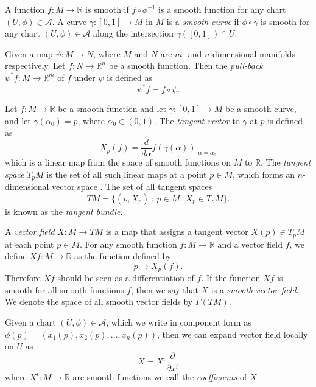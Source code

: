 A function $f : M \to \mathbb{R}$ is smooth if $f \circ \phi^{-1}$ is a smooth function for any chart $(U, \phi) \in \mathcal{A}$. A curve $\gamma : [0, 1] \to M$ in $M$ is a \textit{smooth curve} if $\phi \circ \gamma$ is smooth for any chart $(U, \phi) \in \mathcal{A}$ along the intersection $\gamma([0,1]) \cap U$.

Given a map $\psi : M \to N$, where $M$ and $N$ are $m$- and $n$-dimensional manifolds respectively. Let $f : N \to \mathbb{R}^n$ be a smooth function. Then the \textit{pull-back} $\psi^* f : M \to \mathbb{R}^m$ of $f$ under $\psi$ is defined as
\begin{equation}
	\psi^* f = f \circ \psi.
\end{equation}

Let $f : M \to \mathbb{R}$ be a smooth function and let $\gamma : [0, 1] \to M$ be a smooth curve, and let $\gamma(\alpha_0) = p$, where $\alpha_0 \in (0,1)$. The \textit{tangent vector} to $\gamma$ at $p$ is defined as
\begin{equation}
	X_p(f) = \frac{d}{d \alpha} f(\gamma(\alpha)) \bigg|_{\alpha = \alpha_0}
\end{equation}
which is a linear map from the space of smooth functions on $M$ to $\mathbb{R}$. The \textit{tangent space} $T_p M$ is the set of all such linear maps at a point $p \in M$, which forms an $n$-dimensional vector space \citep{misnerGravitation2017}. The set of all tangent spaces
\begin{equation}
	TM = \{ (p, X_p)\ :\ p \in M,\ X_p \in T_p M \}.
\end{equation}
is known as the \textit{tangent bundle}.

A \textit{vector field} $X : M \to TM$ is a map that assigns a tangent vector $X(p) \in T_p M$ at each point $p \in M$. For any smooth function $f : M \to \mathbb{R}$ and a vector field $f$, we define $X f: M \to \mathbb{R}$ as the function defined by
\begin{equation}
p \mapsto X_p(f).
\end{equation}
Therefore $X f$ should be seen as a differentiation of $f$. If the function $X f$ is smooth for all smooth functions $f$, then we say that $X$ is a \textit{smooth vector field}. We denote the space of all smooth vector fields by $\Gamma(TM)$. 

Given a chart $(U, \phi) \in \mathcal{A}$, which we write in component form as $\phi(p) = (x_1(p), x_2(p), \dots, x_n(p))$, then we can expand vector field locally on $U$ as \citep{misnerGravitation2017}
\begin{equation}
	X = X^i \frac{\partial}{\partial x^i}
\end{equation}
where $X^i : M \to \mathbb{R}$ are smooth functions we call the \textit{coefficients} of $X$.

